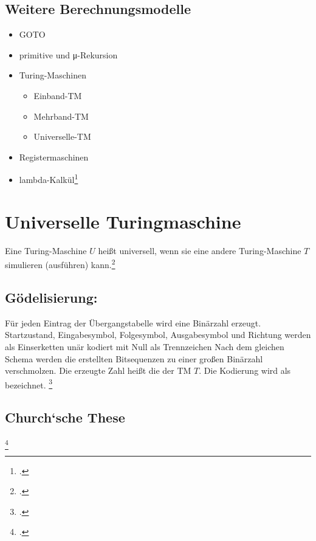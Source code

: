 \documentclass{lehramt-informatik-haupt}
\begin{document}
\subsection{Weitere Berechnungsmodelle}

\begin{itemize}
\item GOTO
\item primitive und μ-Rekursion

\item Turing-Maschinen
\begin{itemize}
\item Einband-TM
\item Mehrband-TM
\item Universelle-TM

\end{itemize}
\item Registermaschinen
\item lambda-Kalkül\footcite[Seite 17]{theo:fs:4}
\end{itemize}

%

\section{Universelle Turingmaschine}


Eine Turing-Maschine $U$ heißt universell, wenn sie eine andere
Turing-Maschine $T$ simulieren (ausführen) kann.\footcite[Seite
23]{theo:fs:4}

\subsection{Gödelisierung:}

Für jeden Eintrag der Übergangstabelle wird eine Binärzahl erzeugt.
Startzustand, Eingabesymbol, Folgesymbol, Ausgabesymbol und Richtung
werden als Einserketten unär kodiert mit Null als Trennzeichen Nach dem
gleichen Schema werden die erstellten Bitsequenzen zu einer großen
Binärzahl verschmolzen. Die erzeugte Zahl heißt die 
der TM $T$. Die Kodierung wird als  bezeichnet.
\footcite[Seite 23]{theo:fs:4}

\subsection{Church‘sche These}
\footcite{wiki:church-these}
\end{document}

